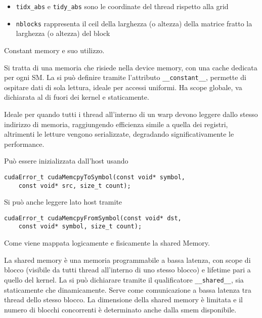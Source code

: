 \begin{questions}
\begin{solution}
\begin{itemize}
            \item \texttt{tidx\_abs} e \texttt{tidy\_abs} sono le coordinate del thread rispetto alla grid
            
            \item \texttt{nblocks} rappresenta il ceil della larghezza (o altezza) della matrice fratto la larghezza (o altezza) del block
        \end{itemize}
    \end{solution}
    
    \question Constant memory e suo utilizzo.
    
    \begin{solution}
        Si tratta di una memoria che risiede nella device memory, con una cache dedicata per ogni SM. La si può definire tramite l'attributo \texttt{\_\_constant\_\_}, permette di ospitare dati di sola lettura, ideale per accessi uniformi. Ha scope globale, va dichiarata al di fuori dei kernel e staticamente.
        
        Ideale per quando tutti i thread all'interno di un warp devono leggere dallo stesso indirizzo di memoria, raggiungendo efficienza simile a quella dei registri, altrimenti le letture vengono serializzate, degradando significativamente le performance.
        
        Può essere inizializzata dall'host usando
        \begin{verbatim}
cudaError_t cudaMemcpyToSymbol(const void* symbol,
    const void* src, size_t count);
        \end{verbatim}
        Si può anche leggere lato host tramite
        \begin{verbatim}
cudaError_t cudaMemcpyFromSymbol(const void* dst, 
    const void* symbol, size_t count);
        \end{verbatim}
    \end{solution}
    
    \question Come viene mappata logicamente e fisicamente la shared Memory.
    
    \begin{solution}
        La shared memory è una memoria programmabile a bassa latenza, con scope di blocco (visibile da tutti thread all'interno di uno stesso blocco) e lifetime pari a quello del kernel. La si può dichiarare tramite il qualificatore \texttt{\_\_shared\_\_}, sia staticamente che dinamicamente. Serve come comunicazione a bassa latenza tra thread dello stesso blocco. La dimensione della shared memory è limitata e il numero di blocchi concorrenti è determinato anche dalla smem disponibile.
        

\end{solution}
\end{questions}
